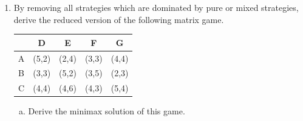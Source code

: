 \documentclass[]{report}
\begin{document}
\begin{enumerate}
\item By removing all strategies which are dominated by pure or mixed strategies,
derive the reduced version of the following matrix game.
\begin{center}
	\begin{tabular}{|c|c|c|c|c|} \hline 
   & D & E & F & G \\ \hline
A & (5,2)& (2,4) & (3,3) & (4,4) \\ \hline
B & (3,3)& (5,2) & (3,5) & (2,3) \\ \hline
C & (4,4)& (4,6) & (4,3) & (5,4) \\ \hline
\end{tabular}
\end{center}
\begin{enumerate}[(a)]
	\item Derive the minimax solution of this game.
\end{enumerate}


\end{enumerate}
\end{document}
